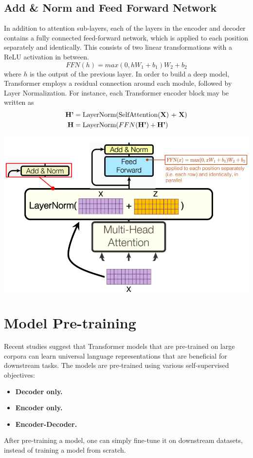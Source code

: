 \subsection{Add \& Norm and Feed Forward Network}
In addition to attention sub-layers, each of the layers in the encoder and decoder contains a fully connected feed-forward network, which is applied to each position separately and identically. This consists of two linear transformations with a ReLU activation in between.
\[FFN(h) = max(0, hW_1 + b_1)W_2 + b_2\]
where $h$ is the output of the previous layer.\newline\newline
In order to build a deep model, Transformer employs a residual connection around each module, followed by Layer Normalization. For instance, each Transformer encoder block may be written as
\[\begin{split}
    \textbf{H'} & = \text{LayerNorm}(\text{SelfAttention(\textbf{X}) + \textbf{X}})\\
    \textbf{H} & = \text{LayerNorm}(FFN(\textbf{H'}) + \textbf{H'})    
\end{split}
\]
\begin{center}
    \includegraphics[scale=0.6]{images/LayerNorm.png}
\end{center}


\section{Model Pre-training}
Recent studies suggest that Transformer models that are pre-trained on large corpora can learn universal language representations that are beneficial for downstream tasks. The models are pre-trained using various self-supervised objectives:
\begin{itemize}
    \item  \textbf{Decoder only.}
    
    \item \textbf{Encoder only.}

    \item \textbf{Encoder-Decoder.}
\end{itemize}
After pre-training a model, one can simply fine-tune it on downstream datasets, instead of training a model from scratch.

